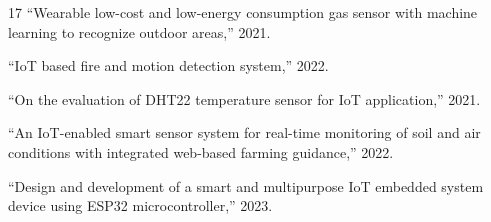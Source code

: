 \documentclass[conference]{IEEEtran}
\begin{document}
\begin{thebibliography}{17}
		``Wearable low-cost and low-energy consumption gas sensor with machine learning
		to recognize outdoor areas,'' 2021.
		
		``IoT based fire and motion detection system,'' 2022.
		
		``On the evaluation of DHT22 temperature sensor for IoT application,'' 2021.
		
		``An IoT-enabled smart sensor system for real-time monitoring of soil and air
		conditions with integrated web-based farming guidance,'' 2022.
		
		``Design and development of a smart and multipurpose IoT embedded system device
		using ESP32 microcontroller,'' 2023.
		
	\end{thebibliography}
	
\end{document}
